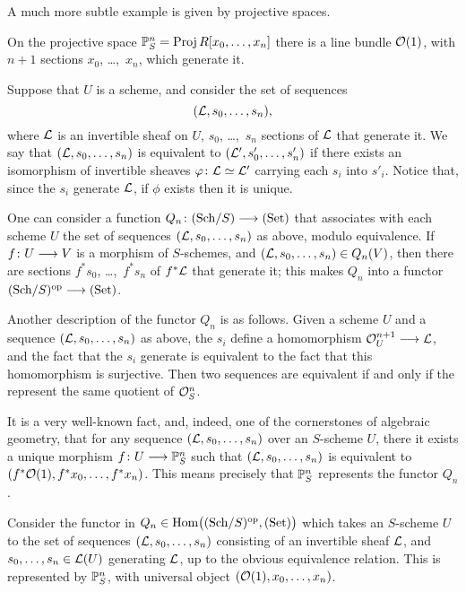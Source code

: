 \begin{2   CONTRAVARIANT FUNCTORS}
\begin{2.1 Yoneda Lemma}
A much more subtle example is given by projective spaces.

\begin{example}
On the projective space $\mathbb{P}^n_S = \operatorname{Proj} R[x_0, \ldots, x_n]$ there is a line bundle $\mathcal{O}(1)$, with $n+1$ sections $x_0$, \dots,~$x_n$, which generate it.

Suppose that $U$ is a scheme, and consider the set of sequences
   \[
   (\mathcal{L}, s_0, \ldots, s_n),
   \]
where $\mathcal{L}$ is an invertible sheaf on $U$, $s_0$, \dots,~$s_n$ sections of $\mathcal{L}$ that generate it. We say that $(\mathcal{L}, s_0, \ldots, s_n)$ is equivalent to $(\mathcal{L}', s'_0, \ldots, s'_n)$ if there exists an isomorphism of invertible sheaves $\varphi\colon \mathcal{L} \simeq \mathcal{L}'$ carrying each $s_i$ into $s'_i$. Notice that, since the $s_i$ generate $\mathcal{L}$, if $\phi$ exists then it is unique.

One can consider a function $Q_n \colon \catsch{S} \arr \catset$ that associates with each scheme $U$ the set of sequences $(\mathcal{L}, s_0, \ldots, s_n)$ as above, modulo equivalence. If $f \colon U \arr V$ is a morphism of $S$-schemes, and $(\mathcal{L}, s_0, \ldots, s_n)\in Q_{n}(V)$, then there are sections $f^*s_0$, \dots,~$f^*s_n$ of $f^* \mathcal{L}$ that generate it; this makes $Q_n$ into a functor $\catsch{S}\op \arr \catset$.

Another description of the functor $Q_n$ is as follows. Given a scheme $U$ and a sequence $(\mathcal{L}, s_0, \ldots, s_n)$ as above, the $s_i$ define a homomorphism $\cO_U^{n+1} \arr \cL$, and the fact that the $s_i$ generate is equivalent to the fact that this homomorphism is surjective. Then two sequences are equivalent if and only if the represent the same quotient of $\mathcal{O}_S^n$.

It is a very well-known fact, and, indeed, one of the cornerstones of algebraic geometry, that for any sequence $(\mathcal{L}, s_0, \ldots, s_n)$ over an $S$-scheme $U$, there it exists a unique morphism $f \colon U \arr \PP^n_S$ such that $(\mathcal{L}, s_0, \ldots, s_n)$ is equivalent to $(f^*\mathcal{O}(1), f^*x_0, \ldots, f^*x_n)$. This means precisely that $\mathbb{P}^n_S$ represents the functor $Q_n$.
\end{example}
\begin{shaded}
Consider the functor in $Q_n\in\mathrm{Hom}\bigl(({\mathrm{Sch}/S})^{\mathrm{op}}, (\mathrm{Set})\bigr)$ which takes an $S$-scheme $U$ to the set of sequences $(\mathcal{L}, s_0, \ldots, s_n)$ consisting of an invertible sheaf $\mathcal{L}$, and $s_0,\ldots,s_n\in\mathcal{L}(U)$ generating $\mathcal{L}$, up to the obvious equivalence relation. This is represented by $\mathbb{P}^n_S$, with universal object $(\mathcal{O}(1),x_0,\ldots,x_n)$.
\end{shaded}


\end{2.1 Yoneda Lemma}
\end{2   CONTRAVARIANT FUNCTORS}
